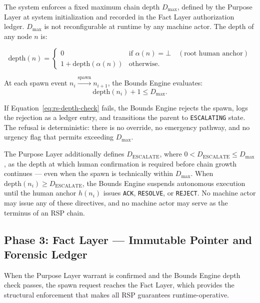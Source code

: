 The system enforces a fixed maximum chain depth $D_{\max}$, defined by the Purpose Layer at system initialization and recorded in the Fact Layer authorization ledger. $D_{\max}$ is not reconfigurable at runtime by any machine actor. The depth of any node $n$ is:

\begin{equation}
\text{depth}(n) =
\begin{cases}
0 & \text{if } \alpha(n) = \bot \quad (\text{root human anchor}) \\[6pt]
1 + \text{depth}(\alpha(n)) & \text{otherwise}.
\end{cases}
\label{eq:rs-depth}
\end{equation}

At each spawn event $n_i \xrightarrow{\text{spawn}} n_{i+1}$, the Bounds Engine evaluates:
\begin{equation}
\text{depth}(n_i) + 1 \leq D_{\max}.
\label{eq:rs-depth-check}
\end{equation}

If Equation~\ref{eq:rs-depth-check} fails, the Bounds Engine rejects the spawn, logs the rejection as a ledger entry, and transitions the parent to \texttt{ESCALATING} state. The refusal is deterministic: there is no override, no emergency pathway, and no urgency flag that permits exceeding $D_{\max}$.

The Purpose Layer additionally defines $D_{\text{ESCALATE}}$, where $0 < D_{\text{ESCALATE}} \leq D_{\max}$, as the depth at which human confirmation is required before chain growth continues — even when the spawn is technically within $D_{\max}$. When $\text{depth}(n_i) \geq D_{\text{ESCALATE}}$, the Bounds Engine suspends autonomous execution until the human anchor $h(n_i)$ issues \texttt{ACK}, \texttt{RESOLVE}, or \texttt{REJECT}. No machine actor may issue any of these directives, and no machine actor may serve as the terminus of an RSP chain.

\subsection{Phase 3: Fact Layer — Immutable Pointer and Forensic Ledger}
\label{sec:rs-phase3}

When the Purpose Layer warrant is confirmed and the Bounds Engine depth check passes, the spawn request reaches the Fact Layer, which provides the structural enforcement that makes all RSP guarantees runtime-operative.

